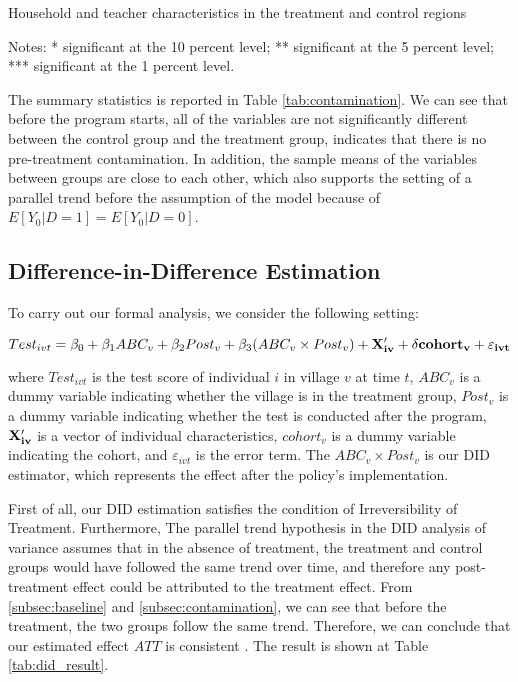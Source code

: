 \documentclass[12pt]{jfm}
\begin{document}
\begin{table}
  \begin{center}
    \begin{footnotesize}
    \caption{Household and teacher characteristics in the treatment and control regions}
    \label{tab:contamination}
    

    Notes: * significant at the 10 percent level; ** significant at the 5 percent level; *** significant at the 1 percent level.
    \end{footnotesize}
  \end{center}
\end{table}

The summary statistics is reported in Table \ref{tab:contamination}. We can see that before the program starts, all of the variables are not significantly different between the control group and the treatment group, indicates that there is no pre-treatment contamination. In addition, the sample means of the variables between groups are close to each other, which also supports the setting of a parallel trend before the assumption of the model because of $E[Y_0\big|D = 1] = E[Y_0\big|D = 0]$.

\subsection{Difference-in-Difference Estimation} \label{subsec:did}

To carry out our formal analysis, we consider the following setting:

\begin{equation}
 Test_{ivt} = \beta_0 + \beta_1 ABC_{v} + \beta_2 Post_{v} + \beta_3 (ABC_v \times Post_v) + \bf{X}_{iv}^\prime + \delta cohort_{v} + \varepsilon_{ivt} \label{eq:did_baseline}  
\end{equation}

where $Test_{ivt}$ is the test score of individual $i$ in village $v$ at time $t$, $ABC_v$ is a dummy variable indicating whether the village is in the treatment group, $Post_v$ is a dummy variable indicating whether the test is conducted after the program, $\bf{X}_{iv}^\prime$ is a vector of individual characteristics, $cohort_{v}$ is a dummy variable indicating the cohort, and $\varepsilon_{ivt}$ is the error term. The $ABC_v \times Post_v$ is our DID estimator, which represents the effect after the policy's implementation.

First of all, our DID estimation satisfies the condition of Irreversibility of Treatment. Furthermore, The parallel trend hypothesis in the DID analysis of variance assumes that in the absence of treatment, the treatment and control groups would have followed the same trend over time, and therefore any post-treatment effect could be attributed to the treatment effect. From \ref{subsec:baseline} and \ref{subsec:contamination}, we can see that before the treatment, the two groups follow the same trend. Therefore, we can conclude that our estimated effect $ATT$ is consistent \citep{CALLAWAY2021200}. The result is shown at Table \ref{tab:did_result}.
\end{document}
